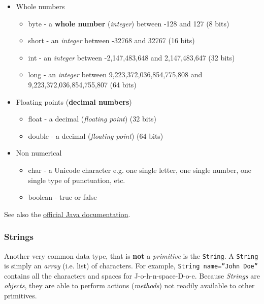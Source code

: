 \documentclass{article}
\begin{document}
\begin{flushleft}
\begin{tcolorbox}[enhanced,width=5in,center upper,
    fontupper=\bfseries,drop fuzzy shadow southwest,
    boxrule=0.4pt,sharp corners,colframe=yellow!80!black,colback=yellow!10]
\begin{itemize}
\item Whole numbers
  \begin{itemize}
  \item byte - a \textbf{whole number} (\emph{integer}) between -128 and 127 (8 bits)
  \item short - an \emph{integer} between -32768 and 32767 (16 bits)
  \item int  - an \emph{integer} between -2,147,483,648 and 2,147,483,647 (32 bits)
  \item long -  an \emph{integer} between 9,223,372,036,854,775,808 and
    9,223,372,036,854,755,807 (64 bits)
  \end{itemize}
  \item Floating points (\textbf{decimal numbers})
    \begin{itemize}
    \item float - a decimal (\emph{floating point}) (32 bits)
    \item double - a decimal (\emph{floating point}) (64 bits)
    \end{itemize}
    \item Non numerical
      \begin{itemize}
      \item char - a Unicode character e.g. one single letter, one single number, one single type of punctuation, etc. 
        \item boolean - true or false 
      \end{itemize}
\end{itemize}
\end{tcolorbox}


{\footnotesize See also the \href{https://docs.oracle.com/javase/tutorial/java/nutsandbolts/datatypes.html}{official Java documentation}.} 
\subsubsection{Strings}
Another very common data type, that is \textbf{not} a \emph{primitive} is the  \texttt{String}. A  \texttt{String} is simply an \emph{array} (i.e. list) of characters. For example,  \texttt{String name=''John Doe''} contains all the characters and spaces for J-o-h-n-space-D-o-e. Because \emph{Strings} are \emph{objects}, they are able to perform actions (\emph{methods}) not readily available to other primitives.  


\end{flushleft}
\end{document}
